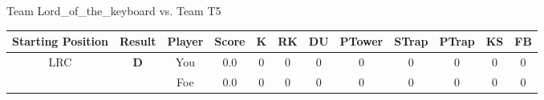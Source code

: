 \documentclass[a4paper,12pt]{article}
\begin{document}
  \vspace*{2em}
  \par {\large {\color{Gray} Team} Lord\_of\_the\_keyboard {\color{Gray}
      vs. Team} T5}
  \newline
  \begin{tabular}[t]{| c | c | c | c | c | c | c | c | c | c | c | c
      |}
    \hline
    Starting Position & \textbf{Result} & Player & \textbf{Score} & K & RK & DU & PTower & STrap & PTrap & KS & FB \\
    
      
                      
      
                      
      
                      
      
                      
      
                      
      
                      
      
        \hline
        \multirow{2}{*}{  LRC
             } &
              \multirow{2}{*}{  
                  \textbf{D}  } & 
                    \cellcolor{yellow!25} You & \cellcolor{yellow!25} 0.0 & \cellcolor{yellow!25} 0 &
                    \cellcolor{yellow!25} 0 & \cellcolor{yellow!25} 0 & \cellcolor{yellow!25} 0 &
                    \cellcolor{yellow!25} 0 & \cellcolor{yellow!25} 0 & \cellcolor{yellow!25} 0 &
                    \cellcolor{yellow!25} 0 \\
                    \cline{3-12}
                    & & \cellcolor{red!15} Foe & \cellcolor{red!15} 0.0 & \cellcolor{red!15} 0 & \cellcolor{red!15}
                    0 & \cellcolor{red!15} 0
                    & \cellcolor{red!15} 0 & \cellcolor{red!15}
                    0 & \cellcolor{red!15} 0 
                    & \cellcolor{red!15} 0 & \cellcolor{red!15}
                    0 \\
                    
                      
      
                      
      
                      
      
                      
      
                      
      
                      
      
                      
      

\end{tabular}
\end{document}
